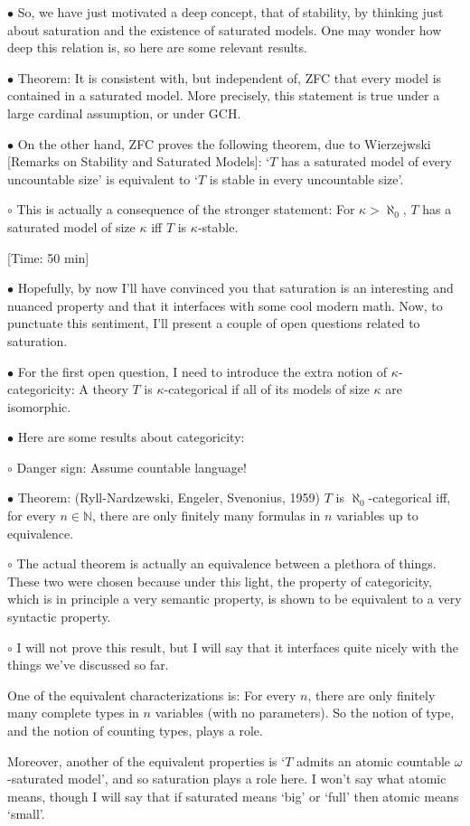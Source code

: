 \documentclass{article}
\newcommand{\N}{\mathbb{N}}
\newcommand\Point[1]{\noindent \hspace{\labelsep} {\large $\bullet$ #1} \smallskip}
\newcommand\point[1]{\noindent \hspace{\labelsep} {\small $\circ$ #1} \smallskip}
\newcommand\timestamp[1]{\noindent \hspace{\labelsep} [Time: #1] }
\begin{document}
\Point{So, we have just motivated a deep concept, that of stability, by thinking just about saturation and the existence of saturated models. One may wonder how deep this relation is, so here are some relevant results.}

\Point{Theorem: It is consistent with, but independent of, ZFC that every model is contained in a saturated model. More precisely, this statement is true under a large cardinal assumption, or under GCH.}

\Point{On the other hand, ZFC proves the following theorem, due to Wierzejwski [Remarks on Stability and Saturated Models]: `$T$ has a saturated model of every uncountable size' is equivalent to `$T$ is stable in every uncountable size'.}

\point{This is actually a consequence of the stronger statement: For $\kappa > \aleph_0$, $T$ has a saturated model of size $\kappa$ iff $T$ is $\kappa$-stable.}

\timestamp{50 min}

\Point{Hopefully, by now I'll have convinced you that saturation is an interesting and nuanced property and that it interfaces with some cool modern math. Now, to punctuate this sentiment, I'll present a couple of open questions related to saturation.}

\Point{For the first open question, I need to introduce the extra notion of $\kappa$-categoricity: A theory $T$ is $\kappa$-categorical if all of its models of size $\kappa$ are isomorphic.}

\Point{Here are some results about categoricity:}

\point{Danger sign: Assume countable language!}

\Point{Theorem: (Ryll-Nardzewski, Engeler, Svenonius, 1959) $T$ is $\aleph_0$-categorical iff, for every $n \in \N$, there are only finitely many formulas in $n$ variables up to equivalence.}

\point{The actual theorem is actually an equivalence between a plethora of things. These two were chosen because under this light, the property of categoricity, which is in principle a very semantic property, is shown to be equivalent to a very syntactic property.}

\point{I will not prove this result, but I will say that it interfaces quite nicely with the things we've discussed so far.

One of the equivalent characterizations is: For every $n$, there are only finitely many complete types in $n$ variables (with no parameters). So the notion of type, and the notion of counting types, plays a role.

Moreover, another of the equivalent properties is `$T$ admits an atomic countable $\omega$-saturated model', and so saturation plays a role here. I won't say what atomic means, though I will say that if saturated means `big' or `full' then atomic means `small'.}
\end{document}
